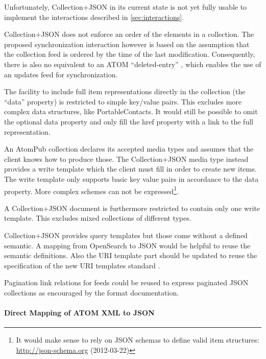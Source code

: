 \documentclass[11pt,a4paper,headsepline,twoside]{scrartcl}		%
\newcommand{\citeurl}[2]{\url{#1} (#2)}
\begin{document}
Unfortunately, Collection+JSON in its current state is not yet fully usable to
implement the interactions described in \ref{sec:interactions}.

Collection+JSON does not enforce an order of the elements in a collection. The
proposed synchronization interaction however is based on the assumption that the
collection feed is ordered by the time of the last modification. Consequently,
there is also no equivalent to an ATOM
``deleted-entry'' \cite{draft-snell-atompub-tombstones-14}, which enables the use
of an updates feed for synchronization.

The facility to include full item representations directly in the collection
(the ``data'' property) is restricted to simple key/value pairs. This excludes
more complex data structures, like PortableContacts. It would still be possible
to omit the optional data property and only fill the href property with a link
to the full representation.

An AtomPub collection declares its accepted media types and assumes that the
client knows how to produce those. The Collection+JSON media type instead
provides a write template which the client must fill in order to create new
items. The write template only supports basic key value pairs in accordance to
the data property. More complex schemes can not be expressed\footnote{It would
  make sense to rely on JSON schemas to define valid item structures:
  \citeurl{http://json-schema.org}{2012-03-22}}.

A Collection+JSON document is furthermore restricted to contain only one write
template. This excludes mixed collections of different types.

Collection+JSON provides query templates but those come without a defined
semantic. A mapping from OpenSearch to JSON would be helpful to reuse the
semantic definitions. Also the URI template part should be updated to reuse the
specification of the new URI templates standard \cite{RFC6570}.

Pagination link relations for feeds \cite{RFC5005} could be reused to express
paginated JSON collections as encouraged by the format
documentation\cite[sec. 5.5]{Amundsen2011a}.


\paragraph{Direct Mapping of ATOM XML to JSON}
\end{document}
